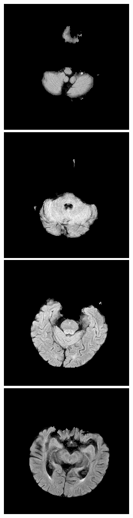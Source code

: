 \documentclass[conference]{IEEEtran}
\begin{document}
\begin{figure}[h!]
\includegraphics[scale = 0.2]{stripped_0.png}
\includegraphics[scale = 0.2]{stripped_4.png}
\includegraphics[scale = 0.2]{stripped_6.png}
\includegraphics[scale = 0.2]{stripped_9.png}

\end{figure}
\end{document}
